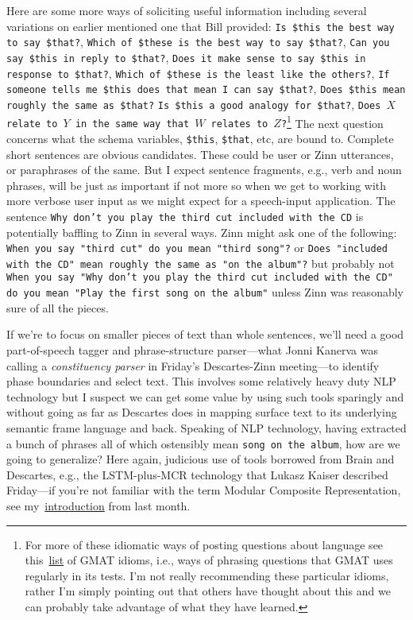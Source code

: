 \documentclass[letterpaper,11pt]{article}
\begin{document}
Here are some more ways of soliciting useful information including several variations on earlier mentioned one that Bill provided: {\tt{Is \$this the best way to say \$that?}}, {\tt{Which of \$these is the best way to say \$that?}}, {\tt{Can you say \$this in reply to \$that?}}, {\tt{Does it make sense to say \$this in response to \$that?}}, {\tt{Which of \$these is the least like the others?}}, {\tt{If someone tells me \$this does that mean I can say \$that?}}, {\tt{Does \$this mean roughly the same as \$that?}} {\tt{Is \$this a good analogy for \$that?}}, {\tt{Does $X$ relate to $Y$ in the same way that $W$ relates to $Z$?}}\footnote{%
%
  For more of these idiomatic ways of posting questions about language see this~\href{http://www.platinumgmat.com/about_gmat/sc_gmat_idiom_list}{list} of GMAT idioms, i.e., ways of phrasing questions that GMAT uses regularly in its tests. I'm not really recommending these particular idioms, rather I'm simply pointing out that others have thought about this and we can probably take advantage of what they have learned.}
%
The next question concerns what the schema variables, {\tt{\$this}}, {\tt{\$that}}, etc, are bound to. Complete short sentences are obvious candidates. These could be user or Zinn utterances, or paraphrases of the same. But I expect sentence fragments, e.g., verb and noun phrases, will be just as important if not more so when we get to working with more verbose user input as we might expect for a speech-input application.  The sentence {\tt{Why don't you play the third cut included with the CD}} is potentially baffling to Zinn in several ways. Zinn might ask one of the following: {\tt{When you say "third cut" do you mean "third song"?}} or {\tt{Does "included with the CD" mean roughly the same as "on the album"?}} but probably not {\tt{When you say "Why don't you play the third cut included with the CD" do you mean "Play the first song on the album"}} unless Zinn was reasonably sure of all the pieces. 

If we're to focus on smaller pieces of text than whole sentences, we'll need a good part-of-speech tagger and phrase-structure parser---what Jonni Kanerva was calling a {\it{constituency parser}} in Friday's Descartes-Zinn meeting---to identify phase boundaries and select text.  This involves some relatively heavy duty NLP technology but I suspect we can get some value by using such tools sparingly and without going as far as Descartes does in mapping surface text to its underlying semantic frame language and back.  Speaking of NLP technology, having extracted a bunch of phrases all of which ostensibly mean {\tt{song on the album}}, how are we going to generalize? Here again, judicious use of tools borrowed from Brain and Descartes, e.g., the LSTM-plus-MCR technology that Lukasz Kaiser described Friday---if you're not familiar with the term Modular Composite Representation, see my~\href{https://x20web.corp.google.com/~tld/quarter/14/3/docs/log/index.html#modular_composite_representations}{introduction} from last month.
\end{document}
